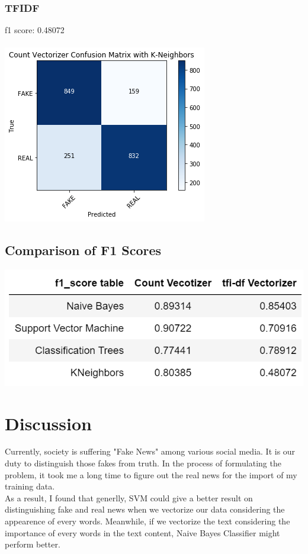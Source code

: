 \documentclass[twoside,twocolumn]{article}
\begin{document}
    \subsubsection{TFIDF}
    f1 score: 0.48072\\
    \\ \noindent \includegraphics[scale=0.6]{knn_tfidf.png}

    \subsection{Comparison of F1 Scores}
    \includegraphics[scale=0.9]{f1.png}
    \section{Discussion}
    Currently, society is suffering "Fake News" among various social media. It is our duty to 
    distinguish those fakes from truth. In the process of formulating the problem, it took me
    a long time to figure out the real news for the import of my training data.
    \\ As a result, I found that generlly, SVM could give a better result on distinguishing fake
    and real news when we vectorize our data considering the appearence of every words. Meanwhile, 
    if we vectorize the text considering the importance of every words in the text content, Naive
    Bayes Classifier might perform better.
\end{document}
